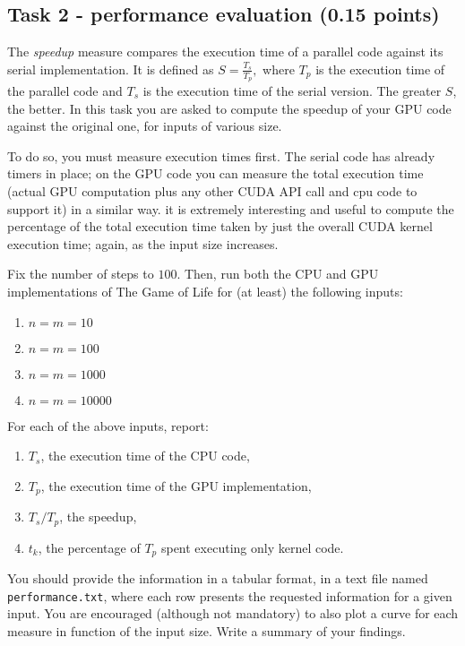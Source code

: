 \documentclass[a4paper, 11pt]{article}
\begin{document}
	
	\subsection{Task 2 - performance evaluation (0.15 points)}
	
	The \emph{speedup} measure compares the execution time of a parallel code against its serial implementation. It is defined as
	\begin{math}
	S = \frac{T_s}{T_p},
	\end{math}
	where $T_p$ is the execution time of the parallel code and $T_s$ is the execution time of the serial version. The greater $S$, the better.
	In this task you are asked to compute the speedup of your GPU code against the original one, for inputs of various size. 
	
	To do so, you must measure execution times first. The serial code has already timers in place; on the GPU code you can measure the total execution time (actual GPU computation plus any other CUDA API call and cpu code to support it) in a similar way. it is extremely interesting and useful to compute the percentage of the total execution time taken by just the overall CUDA kernel execution time; again, as the input size increases.
	
	Fix the number of steps to $100$. Then, run both the CPU and GPU implementations of The Game of Life for (at least) the following inputs:
	\begin{enumerate}
		\item $n = m = 10$
		\item $n = m = 100$
		\item $n = m = 1000$
		\item $n = m = 10000$
	\end{enumerate}
	
	\noindent For each of the above inputs, report:
	
	\begin{enumerate}
		\item $T_s$, the execution time of the CPU code,
		\item $T_p$, the execution time of the GPU implementation,
		\item $T_s/T_p$, the speedup,
		\item $t_k$, the percentage of $T_p$ spent executing only kernel code. 
	\end{enumerate}

You should provide the information in a tabular format, in a text file named \texttt{performance.txt}, where each row presents the requested information for a given input. You are encouraged (although not mandatory) to also plot a curve for each measure in function of the input size. Write a summary of your findings.
\end{document}
